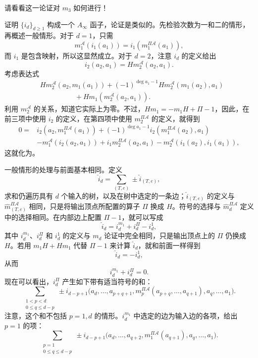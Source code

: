 \begin{exercise*}
请看看这一论证对 $m_3$ 如何进行！
\end{exercise*}

\begin{figure}[H]
\centering
{}
\BookNumberOnlyCaption\label{fig:8.12}
\end{figure}
\begin{figure}[H]
\centering
{}
\BookNumberOnlyCaption\label{fig:8.13}
\end{figure}

证明 $\{i_d\}_{d\geq1}$ 构成一个 $A_\infty$ 函子，论证是类似的。先检验次数为一和二的情形，再概述一般情形。对于 $d=1$，只需
\[
m_1^{\mathcal A}(i_1(a_1))=i_1(m_1^{\Pi\mathcal A}(a_1)),
\]
而 $i_1$ 是包含映射，所以这显然成立。对于 $d=2$，注意 $i_d$ 的定义给出
\[
i_2(a_2,a_1)=Hm_2^{\mathcal A}(a_2,a_1).
\]
考虑表达式
\[
\begin{aligned}
&Hm_2^{\mathcal A}(a_2,m_1(a_1))
+(-1)^{\deg a_1-1}Hm_2^{\mathcal A}(m_1(a_2),a_1)\\
&\hspace{5em}+Hm_1(m_2^{\mathcal A}(a_2,a_1)).
\end{aligned}
\]
利用 $m_2^{\mathcal A}$ 的关系，知道它实际上为零。不过，$Hm_1=-m_1H+\Pi-1$，因此，在前三项中使用 $i_2$ 的定义，在第四项中使用 $m_2^{\Pi\mathcal A}$ 的定义，就得到
\[
\begin{aligned}
0={}&i_2(a_2,m_1^{\Pi\mathcal A}(a_1))
+(-1)^{\deg a_1-1}i_2(m_1^{\Pi\mathcal A}(a_2),a_1)\\
&-m_1^{\mathcal A}(i_2(a_2,a_1))
+i_1m_2^{\Pi\mathcal A}(a_2,a_1)
-m_2^{\mathcal A}(i_1(a_2),i_1(a_1)),
\end{aligned}
\]
这就化为。

一般情形的处理与前面基本相同。定义
\[
\widehat i_d=\sum_{(T,e)}\pm\widehat i_{(T,e)},
\]
求和仍遍历具有 $d$ 个输入的树，以及在树中选定的一条边；$\widehat i_{(T,e)}$ 的定义与 $\widehat m_{(T,e)}^{\Pi\mathcal A}$ 相同，只是将输出顶点所配置的算子 $\Pi$ 换成 $H$。符号的选择与 $\widehat m_d^{\Pi\mathcal A}$ 定义中的选择相同。在内部边上配置 $\Pi-1$，就可以写成
\[
\widehat i_d=i_d^{m_1}+i_d^\Pi-i_d^1,
\]
其中 $i_d^{m_1}$、$i_d^\Pi$ 和 $i_d^1$ 的定义与 $m_d$ 论证中完全相同，只是输出顶点上的 $\Pi$ 仍换成 $H$。若用 $m_1H+Hm_1$ 代替 $\Pi-1$ 来计算 $\widehat i_d$，就和前面一样得到
\[
\widehat i_d=-i_d^1,
\]
从而
\[
i_d^{m_1}+i_d^\Pi=0.
\]
现在可以看出，$i_d^\Pi$ 产生如下带有适当符号的和：
\[
\sum_{\substack{1<p<d\\0\leq q\leq d-p}}
\pm i_{d-p+1}\bigl(a_d,\ldots,a_{p+q+1},
 m_p^{\Pi\mathcal A}(a_{p+q},\ldots,a_{q+1}),
 a_q,\ldots,a_1\bigr).
\]
注意，这个和不包括 $p=1,d$ 的情形。$i_d^{m_1}$ 中选定的边为输入边的各项，给出 $p=1$ 的项：
\[
\sum_{\substack{p=1\\0\leq q\leq d-p}}
\pm i_{d-p+1}\bigl(a_d,\ldots,a_{q+2},
 m_1^{\Pi\mathcal A}(a_{q+1}),a_q,\ldots,a_1\bigr).
\]

